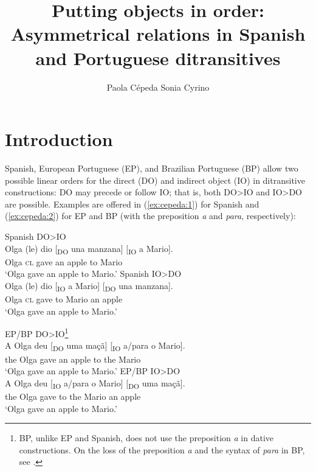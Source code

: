 \documentclass[output=paper,colorlinks,citecolor=brown,nonflat]{./langscibook}
\author{Paola Cépeda\affiliation{Stony Brook University / Pontificia Universidad Católica del Perú}\lastand 
Sonia Cyrino\affiliation{University of Campinas}}
\title{Putting objects in order: Asymmetrical relations in Spanish and Portuguese ditransitives}
\begin{document}
\maketitle
{}

\section{Introduction}\label{sec:cepeda:1}

Spanish, European Portuguese (EP), and Brazilian Portuguese (BP) allow two possible linear orders for the direct (DO) and indirect object (IO) in ditransitive constructions: DO may precede or follow IO; that is, both DO>IO and IO>DO are possible. Examples are offered in (\ref{ex:cepeda:1}) for Spanish and (\ref{ex:cepeda:2}) for EP and BP (with the preposition \textit{a} and \textit{para}, respectively):

\ea%
    \label{ex:cepeda:1}
	\ea\label{ex:cepeda:1a}
	Spanish DO>IO\\
	\gll Olga (le) dio [\textsubscript{DO} una manzana] [\textsubscript{IO} a  Mario]. \\
		Olga \textsc{cl} gave \hspaceThis{[\textsubscript{DO}} an apple \hspaceThis{[\textsubscript{IO}} to Mario \\
	\glt ‘Olga gave an apple to Mario.'
	\ex\label{ex:cepeda:1b}Spanish IO>DO\\
		\gll Olga (le) dio [\textsubscript{IO} a  Mario] [\textsubscript{DO} una manzana]. \\
			Olga \textsc{cl} gave \hspaceThis{[\textsubscript{IO}} to Mario \hspaceThis{[\textsubscript{DO}} an   apple\\
		\glt ‘Olga gave an apple to Mario.’
	\z
\z

\ea%
    \label{ex:cepeda:2}
	\ea\label{ex:cepeda:2a}
	EP/BP DO>IO\footnote{BP, unlike EP and Spanish, does not use the preposition \textit{a} in dative constructions. On the loss of the preposition \textit{a} and the syntax of \textit{para} in BP, see .}\\
	\gll A Olga  deu [\textsubscript{DO} uma maçã] [\textsubscript{IO} a/para  o  Mario].\\
		the Olga gave  \hspaceThis{[\textsubscript{DO}} an   apple \hspaceThis{[\textsubscript{IO}} to the Mario \\
	\glt ‘Olga gave an apple to Mario.’
	\ex\label{ex:cepeda:2b}EP/BP IO>DO\\
	\gll A Olga  deu [\textsubscript{IO} a/para  o  Mario] [\textsubscript{DO} uma maçã]. \\
		the Olga gave \hspaceThis{[\textsubscript{IO}} to the Mario \hspaceThis{[\textsubscript{DO}} an   apple \\
	\glt ‘Olga gave an apple to Mario.’
	\z
\z
\end{document}
